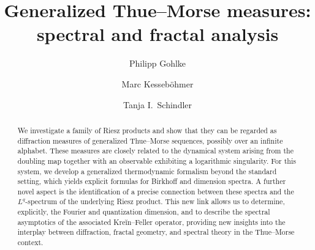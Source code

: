 \documentclass[11pt,reqno]{amsart}
\theoremstyle{plain}
\theoremstyle{definition}
\newcommand{\ts}{\hspace{0.5pt}}
\begin{document}
\title[Generalized Thue{\ts}--Morse measures]{Generalized Thue{\ts}--Morse measures:  \\spectral and fractal analysis
}
 
\author{Philipp Gohlke}
\address{Faculty of Mathematics and Computer Science, Friedrich Schiller University,
\newline 
\hspace*{\parindent}Ernst-Abbe-Platz 2, 07745 Jena, Germany}

\author{Marc Kesseb\"ohmer}
\address{Institute for Dynamical Systems, Faculty 3 – Mathematics und Computer Science,\newline 
\hspace*{\parindent}University of Bremen,\newline 
\hspace*{\parindent}Bibliothekstr.\ 5, 28359 Bremen, Germany}

\author{Tanja I.\ Schindler}
\address{Faculty of Mathematics and Computer Science, Jagiellonian University\newline 
\hspace*{\parindent} Ul.\ Łojasiewicza 6, 30-348 Krakow, Poland\newline 
Department of Mathematics and Statistics,
University of Exeter\newline 
\hspace*{\parindent} Harrison Building, Exeter EX4 4QF,
United Kingdom}
% 

\begin{abstract}
We investigate a family of Riesz products  and show that they can be regarded as diffraction measures of generalized Thue{\ts}--Morse sequences, possibly over an infinite alphabet. 
These measures are closely related to the dynamical system arising from the doubling map together with an observable exhibiting a logarithmic singularity.  For this system, we develop a generalized thermodynamic formalism beyond the standard setting, which yields explicit formulas for  Birkhoff and dimension spectra.  
A further novel aspect is the identification of a precise connection between these spectra and the 
$L^q$-spectrum of the underlying Riesz product. This new link allows us to determine, explicitly, the Fourier and quantization dimension, and to describe the spectral asymptotics of the associated Kreĭn--Feller operator, providing new insights into the interplay between diffraction, fractal geometry, and spectral theory in the Thue{\ts}--Morse context. \end{abstract}
\end{document}
